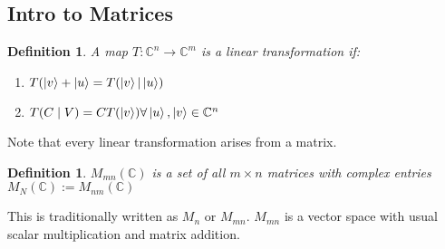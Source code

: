\documentclass[12pt]{article}
\theoremstyle{plain}
\theoremstyle{nonumberplain}
\theoremstyle{plain}
\newtheorem{definition}[lemma]{Definition}
\theoremstyle{nonumberplain}
\newcommand\1{{\bf 1}}
\newcommand{\C}{\mathbb{C}} %
\newcommand{\<}{\left\langle}
\renewcommand{\>}{\right\rangle}
\begin{document}

\subsection{Intro to Matrices}

\begin{definition}
A map $T: \C^n\longrightarrow\C^m$ is a linear transformation if:
\begin{enumerate}
	\item $T(\ket{v}+\ket{u}=T(\ket{v}|\ket{u})$
	\item $T(C\mid V)=CT(\ket{v}) \forall \ket{u},\ket{v}\in\C^n$
\end{enumerate}
\end{definition}
Note that every linear transformation arises from a matrix.
\begin{definition}
$M_{mn}(\C)$ is a set of all $m\times n$ matrices with complex entries $M_N(\C):=M_{nm}(\C)$
\end{definition}
This is traditionally written as $M_n$ or $M_{mn}$. $M_{mn}$ is a vector space with usual scalar multiplication and matrix addition.
\end{document}
